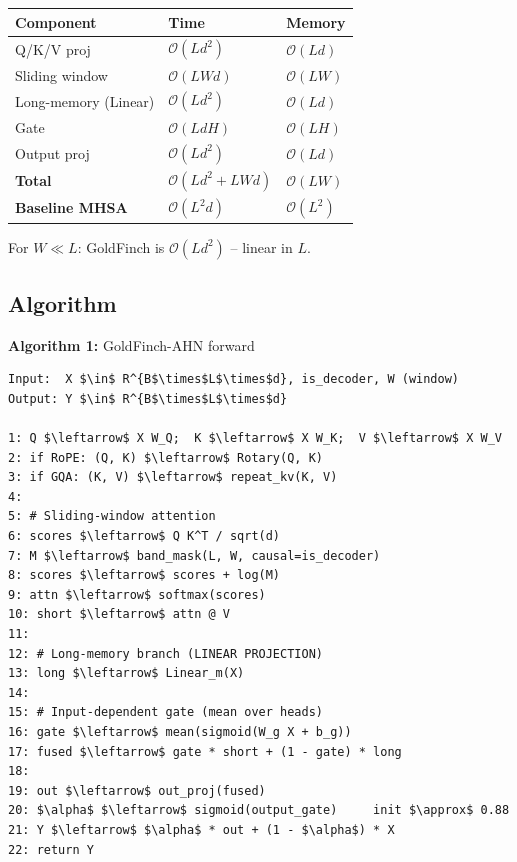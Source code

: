 \begin{table}[H]
\centering
\small
\begin{tabular}{lll}
\toprule
\textbf{Component} & \textbf{Time} & \textbf{Memory} \\
\midrule
Q/K/V proj & $\mathcal{O}(Ld^2)$ & $\mathcal{O}(Ld)$ \\
Sliding window & $\mathcal{O}(LWd)$ & $\mathcal{O}(LW)$ \\
Long-memory (Linear) & $\mathcal{O}(Ld^2)$ & $\mathcal{O}(Ld)$ \\
Gate & $\mathcal{O}(LdH)$ & $\mathcal{O}(LH)$ \\
Output proj & $\mathcal{O}(Ld^2)$ & $\mathcal{O}(Ld)$ \\
\textbf{Total} & $\mathcal{O}(Ld^2 + LWd)$ & $\mathcal{O}(LW)$ \\
\textbf{Baseline MHSA} & $\mathcal{O}(L^2 d)$ & $\mathcal{O}(L^2)$ \\
\bottomrule
\end{tabular}
\end{table}

For $W \ll L$: GoldFinch is $\mathcal{O}(L d^2)$ -- linear in $L$.

\subsection{Algorithm}

\textbf{Algorithm 1:} GoldFinch-AHN forward
\begin{lstlisting}
Input:  X $\in$ R^{B$\times$L$\times$d}, is_decoder, W (window)
Output: Y $\in$ R^{B$\times$L$\times$d}

1: Q $\leftarrow$ X W_Q;  K $\leftarrow$ X W_K;  V $\leftarrow$ X W_V
2: if RoPE: (Q, K) $\leftarrow$ Rotary(Q, K)
3: if GQA: (K, V) $\leftarrow$ repeat_kv(K, V)
4:
5: # Sliding-window attention
6: scores $\leftarrow$ Q K^T / sqrt(d)
7: M $\leftarrow$ band_mask(L, W, causal=is_decoder)
8: scores $\leftarrow$ scores + log(M)
9: attn $\leftarrow$ softmax(scores)
10: short $\leftarrow$ attn @ V
11:
12: # Long-memory branch (LINEAR PROJECTION)
13: long $\leftarrow$ Linear_m(X)
14:
15: # Input-dependent gate (mean over heads)
16: gate $\leftarrow$ mean(sigmoid(W_g X + b_g))
17: fused $\leftarrow$ gate * short + (1 - gate) * long
18:
19: out $\leftarrow$ out_proj(fused)
20: $\alpha$ $\leftarrow$ sigmoid(output_gate)     init $\approx$ 0.88
21: Y $\leftarrow$ $\alpha$ * out + (1 - $\alpha$) * X
22: return Y
\end{lstlisting}

